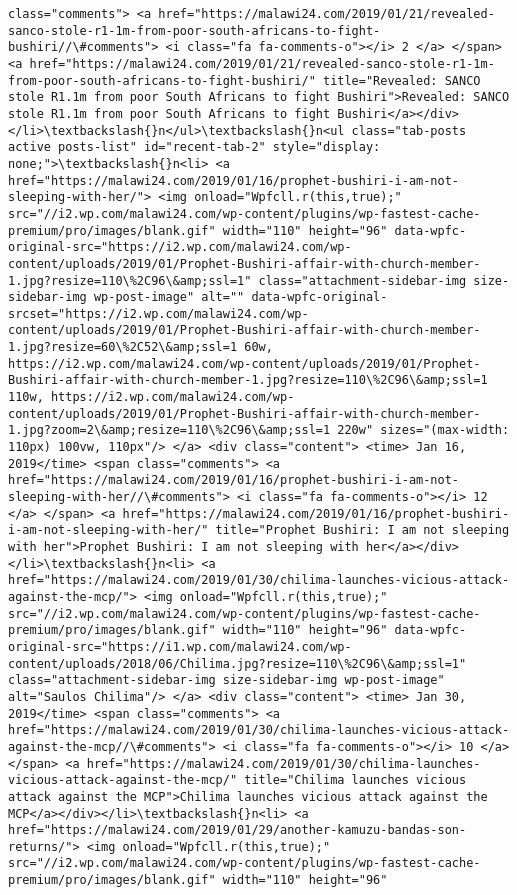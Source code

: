 \documentclass[11pt]{article}
\begin{document}
\begin{Verbatim}[commandchars=\\\{\}]
class="comments"> <a href="https://malawi24.com/2019/01/21/revealed-sanco-stole-r1-1m-from-poor-south-africans-to-fight-bushiri//\#comments"> <i class="fa fa-comments-o"></i> 2 </a> </span> <a href="https://malawi24.com/2019/01/21/revealed-sanco-stole-r1-1m-from-poor-south-africans-to-fight-bushiri/" title="Revealed: SANCO stole R1.1m from poor South Africans to fight Bushiri">Revealed: SANCO stole R1.1m from poor South Africans to fight Bushiri</a></div></li>\textbackslash{}n</ul>\textbackslash{}n<ul class="tab-posts active posts-list" id="recent-tab-2" style="display: none;">\textbackslash{}n<li> <a href="https://malawi24.com/2019/01/16/prophet-bushiri-i-am-not-sleeping-with-her/"> <img onload="Wpfcll.r(this,true);" src="//i2.wp.com/malawi24.com/wp-content/plugins/wp-fastest-cache-premium/pro/images/blank.gif" width="110" height="96" data-wpfc-original-src="https://i2.wp.com/malawi24.com/wp-content/uploads/2019/01/Prophet-Bushiri-affair-with-church-member-1.jpg?resize=110\%2C96\&amp;ssl=1" class="attachment-sidebar-img size-sidebar-img wp-post-image" alt="" data-wpfc-original-srcset="https://i2.wp.com/malawi24.com/wp-content/uploads/2019/01/Prophet-Bushiri-affair-with-church-member-1.jpg?resize=60\%2C52\&amp;ssl=1 60w, https://i2.wp.com/malawi24.com/wp-content/uploads/2019/01/Prophet-Bushiri-affair-with-church-member-1.jpg?resize=110\%2C96\&amp;ssl=1 110w, https://i2.wp.com/malawi24.com/wp-content/uploads/2019/01/Prophet-Bushiri-affair-with-church-member-1.jpg?zoom=2\&amp;resize=110\%2C96\&amp;ssl=1 220w" sizes="(max-width: 110px) 100vw, 110px"/> </a> <div class="content"> <time> Jan 16, 2019</time> <span class="comments"> <a href="https://malawi24.com/2019/01/16/prophet-bushiri-i-am-not-sleeping-with-her//\#comments"> <i class="fa fa-comments-o"></i> 12 </a> </span> <a href="https://malawi24.com/2019/01/16/prophet-bushiri-i-am-not-sleeping-with-her/" title="Prophet Bushiri: I am not sleeping with her">Prophet Bushiri: I am not sleeping with her</a></div></li>\textbackslash{}n<li> <a href="https://malawi24.com/2019/01/30/chilima-launches-vicious-attack-against-the-mcp/"> <img onload="Wpfcll.r(this,true);" src="//i2.wp.com/malawi24.com/wp-content/plugins/wp-fastest-cache-premium/pro/images/blank.gif" width="110" height="96" data-wpfc-original-src="https://i1.wp.com/malawi24.com/wp-content/uploads/2018/06/Chilima.jpg?resize=110\%2C96\&amp;ssl=1" class="attachment-sidebar-img size-sidebar-img wp-post-image" alt="Saulos Chilima"/> </a> <div class="content"> <time> Jan 30, 2019</time> <span class="comments"> <a href="https://malawi24.com/2019/01/30/chilima-launches-vicious-attack-against-the-mcp//\#comments"> <i class="fa fa-comments-o"></i> 10 </a> </span> <a href="https://malawi24.com/2019/01/30/chilima-launches-vicious-attack-against-the-mcp/" title="Chilima launches vicious attack against the MCP">Chilima launches vicious attack against the MCP</a></div></li>\textbackslash{}n<li> <a href="https://malawi24.com/2019/01/29/another-kamuzu-bandas-son-returns/"> <img onload="Wpfcll.r(this,true);" src="//i2.wp.com/malawi24.com/wp-content/plugins/wp-fastest-cache-premium/pro/images/blank.gif" width="110" height="96" 
\end{Verbatim}
\end{document}

